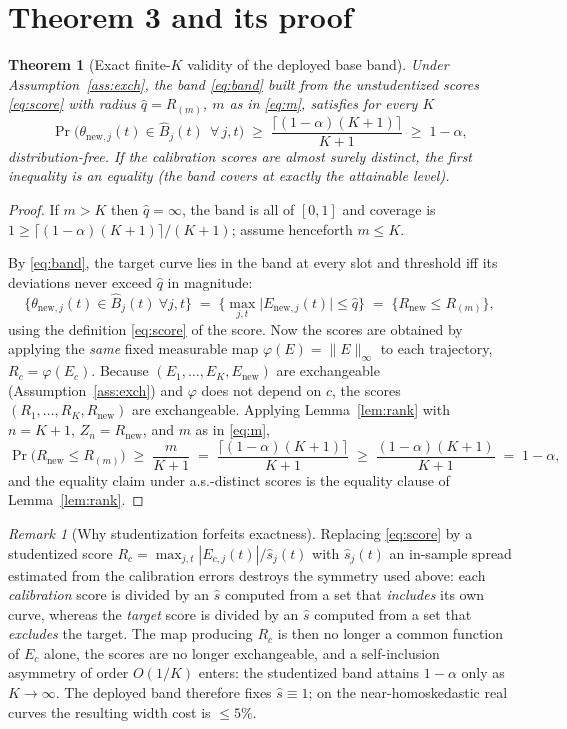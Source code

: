 \documentclass[12pt]{article}
\newtheorem{theorem}{Theorem}
\theoremstyle{definition}
\theoremstyle{remark}
\newtheorem{remark}{Remark}
\newcommand{\Rnew}{R_{\mathrm{new}}}
\begin{document}
\section*{Theorem 3 and its proof}

\begin{theorem}[Exact finite-$K$ validity of the deployed base band]\label{thm:exact}
Under Assumption~\ref{ass:exch}, the band \eqref{eq:band} built from the unstudentized
scores \eqref{eq:score} with radius $\widehat q=R_{(m)}$, $m$ as in \eqref{eq:m}, satisfies
for \emph{every} $K$
\[
  \Pr\Big(\theta_{\mathrm{new},j}(t)\in\widehat B_j(t)\ \ \forall\, j,t\Big)
  \;\ge\; \frac{\big\lceil(1-\alpha)(K+1)\big\rceil}{K+1}\;\ge\;1-\alpha,
\]
distribution-free. If the calibration scores are almost surely distinct, the first
inequality is an equality (the band covers at exactly the attainable level).
\end{theorem}

\begin{proof}
If $m>K$ then $\widehat q=\infty$, the band is all of $[0,1]$ and coverage is $1\ge
\lceil(1-\alpha)(K+1)\rceil/(K+1)$; assume henceforth $m\le K$.

By \eqref{eq:band}, the target curve lies in the band at every slot and threshold iff its
deviations never exceed $\widehat q$ in magnitude:
\[
  \big\{\theta_{\mathrm{new},j}(t)\in\widehat B_j(t)\ \forall j,t\big\}
  \;=\;\Big\{\max_{j,t}\big|E_{\mathrm{new},j}(t)\big|\le\widehat q\Big\}
  \;=\;\big\{\Rnew\le R_{(m)}\big\},
\]
using the definition \eqref{eq:score} of the score. Now the scores are obtained by applying
the \emph{same} fixed measurable map $\varphi(E)=\|E\|_\infty$ to each trajectory,
$R_c=\varphi(E_c)$. Because $(E_1,\dots,E_K,E_{\mathrm{new}})$ are exchangeable
(Assumption~\ref{ass:exch}) and $\varphi$ does not depend on $c$, the scores
$(R_1,\dots,R_K,\Rnew)$ are exchangeable. Applying Lemma~\ref{lem:rank} with $n=K+1$,
$Z_n=\Rnew$, and $m$ as in \eqref{eq:m},
\[
  \Pr\big(\Rnew\le R_{(m)}\big)\;\ge\;\frac{m}{K+1}
  \;=\;\frac{\lceil(1-\alpha)(K+1)\rceil}{K+1}\;\ge\;\frac{(1-\alpha)(K+1)}{K+1}\;=\;1-\alpha,
\]
and the equality claim under a.s.-distinct scores is the equality clause of
Lemma~\ref{lem:rank}. \qedhere
\end{proof}

\begin{remark}[Why studentization forfeits exactness]
Replacing \eqref{eq:score} by a studentized score $R_c=\max_{j,t}|E_{c,j}(t)|/\widehat s_j(t)$
with $\widehat s_j(t)$ an in-sample spread estimated from the calibration errors destroys the
symmetry used above: each \emph{calibration} score is divided by an $\widehat s$ computed from
a set that \emph{includes} its own curve, whereas the \emph{target} score is divided by an
$\widehat s$ computed from a set that \emph{excludes} the target. The map producing $R_c$ is
then no longer a common function of $E_c$ alone, the scores are no longer exchangeable, and a
self-inclusion asymmetry of order $O(1/K)$ enters: the studentized band attains $1-\alpha$
only as $K\to\infty$. The deployed band therefore fixes $\widehat s\equiv 1$; on the
near-homoskedastic real curves the resulting width cost is $\le 5\%$.
\end{remark}
\end{document}

